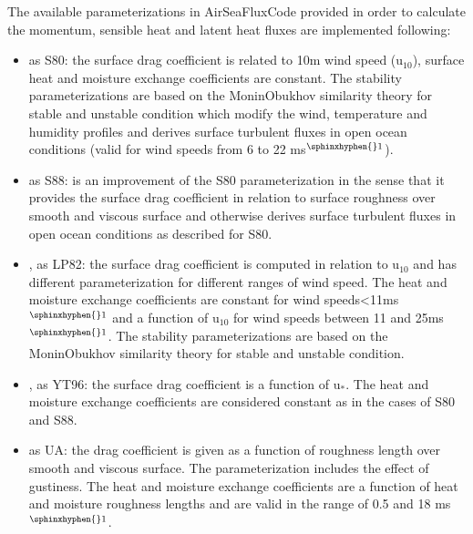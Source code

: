 \documentclass[letterpaper,10pt,english]{sphinxmanual}
\begin{document}
\sphinxAtStartPar
The available parameterizations in AirSeaFluxCode provided in order to calculate the momentum, sensible heat and latent heat fluxes are implemented following:
\begin{itemize}
\item {} 
\sphinxAtStartPar
{} as S80: the surface drag coefficient is related to 10m wind speed (u$_{\text{10}}$), surface heat and moisture exchange coefficients are constant. The stability parameterizations are based on the Monin\sphinxhyphen{}Obukhov similarity theory for stable and unstable condition which modify the wind, temperature and humidity profiles and derives surface turbulent fluxes in open ocean conditions (valid for wind speeds from 6 to 22 ms$^{\text{\sphinxhyphen{}1}}$).

\item {} 
\sphinxAtStartPar
{} as S88: is an improvement of the S80 parameterization in the sense that it provides the surface drag coefficient in relation to surface roughness over smooth and viscous surface and otherwise derives surface turbulent fluxes in open ocean conditions as described for S80.

\item {} 
\sphinxAtStartPar
{},  as LP82: the surface drag coefficient is computed in relation to u$_{\text{10}}$ and has different parameterization for different ranges of wind speed. The heat and moisture exchange coefficients are constant for wind speeds\textless{}11ms$^{\text{\sphinxhyphen{}1}}$ and a function of u$_{\text{10}}$ for wind speeds between 11 and 25ms$^{\text{\sphinxhyphen{}1}}$. The stability parameterizations are based on the Monin\sphinxhyphen{}Obukhov similarity theory for stable and unstable condition.

\item {} 
\sphinxAtStartPar
{},  as YT96: the surface drag coefficient is a function of u$_{\text{*}}$. The heat and moisture exchange coefficients are considered constant as in the cases of S80 and S88.

\item {} 
\sphinxAtStartPar
{} as UA: the drag coefficient is given as a function of roughness length over smooth and viscous surface. The parameterization includes the effect of gustiness. The heat and moisture exchange coefficients are a function of heat and moisture roughness lengths and are valid in the range of 0.5 and 18 ms$^{\text{\sphinxhyphen{}1}}$.


\end{itemize}
\end{document}
